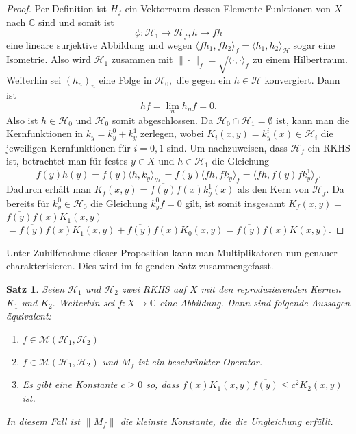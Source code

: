 \documentclass[12pt,titlepage,twoside,cleardoublepage]{article}
\theoremstyle{nummermitklammern}
\newtheorem{satz}[temp]{Satz}
\newtheorem{satz}[zahl]{Satz}
\numberwithin{equation}{section}
\begin{document}
\begin{proof}
Per Definition ist $H_f$ ein Vektorraum dessen Elemente Funktionen von $X$ nach $\mathbb{C}$ sind und somit ist 
\[
\phi:\mathcal{H}_1 \to \mathcal{H}_f,h\mapsto fh
\]  
eine lineare surjektive Abbildung und wegen $\langle fh_1,fh_2\rangle_f=\langle h_1,h_2 \rangle_{\mathcal{H}}$ sogar eine Isometrie. Also wird $\mathcal{H}_1$ zusammen mit $\|\cdot\|_f=\sqrt{\langle \cdot,\cdot \rangle_f}$ zu einem Hilbertraum.
Weiterhin sei $(h_n)_n$ eine Folge in $\mathcal{H}_0,$ die gegen ein $h\in \mathcal{H}$ konvergiert. Dann ist
\[
hf=\lim_n h_nf=0.
\] Also ist $h\in \mathcal{H}_0$ und $\mathcal{H}_0$ somit abgeschlossen.
 Da $\mathcal{H}_0\cap \mathcal{H}_1=\emptyset$ ist, kann man die Kernfunktionen in $k_y=k_y^0+k_y^1$ zerlegen, wobei $K_i(x,y)=k^i_y(x)\in \mathcal{H}_i$ die jeweiligen Kernfunktionen für $i=0,1$ sind.
Um nachzuweisen, dass $\mathcal{H}_f$ ein RKHS ist, betrachtet man für festes $y\in X$ und $h\in \mathcal{H}_1$ die Gleichung 
\[
f(y)h(y)=f(y)\langle h,k_y\rangle_{\mathcal{H}}=f(y)\langle fh,fk_y\rangle_f=\langle fh,\overline{f(y)}fk_y^1\rangle_f.
\] 
Dadurch erhält man $K_f(x,y)=\overline{f(y)}f(x)k_y^1(x)$ als den Kern von $\mathcal{H}_f.$ Da bereits für $k^0_y\in \mathcal{H}_0$ die Gleichung $k^0_yf=0$ gilt, ist somit insgesamt $K_f(x,y)=$ $\overline{f(y)}f(x)K_1(x,y)$ $=\overline{f(y)}f(x)K_1(x,y)+\overline{f(y)}f(x)K_0(x,y)=\overline{f(y)}f(x)K(x,y).$
\end{proof}
Unter Zuhilfenahme dieser Proposition kann man Multiplikatoren nun genauer charakterisieren. Dies wird im folgenden Satz zusammengefasst. 
\begin{satz}
Seien $\mathcal{H}_1$ und $\mathcal{H}_2$ zwei RKHS auf $X$ mit den reproduzierenden Kernen $K_1$ und $K_2.$ Weiterhin sei $f:X\to  \mathbb{C}$ eine Abbildung. Dann sind folgende Aussagen äquivalent:
\begin{enumerate}
\item $f\in \mathcal{M}(\mathcal{H}_1,\mathcal{H}_2)$
\item  $f\in \mathcal{M}(\mathcal{H}_1,\mathcal{H}_2)$ und $M_f$ ist ein beschränkter Operator.
\item Es gibt eine Konstante $c\geq 0 $ so, dass $f(x)K_1(x,y)\overline{f(y)} \leq c^2 K_2(x,y)$ ist.
\end{enumerate}
In diesem Fall ist $\|M_f\|$ die kleinste Konstante, die die Ungleichung erfüllt.
\end{satz}
\end{document}
